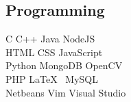 \documentclass[a4paper]{deedy-resume} %
\begin{document}
\begin{minipage}[t]{0.33\textwidth}
\subsection{Programming}

C \textbullet{} C++ \textbullet{} Java \textbullet{} NodeJS \\
HTML \textbullet{} CSS \textbullet{} JavaScript \\ 
Python \textbullet{} MongoDB \textbullet{} OpenCV \\
PHP \textbullet{} \LaTeX\ \textbullet{} MySQL \\
Netbeans \textbullet{} Vim \textbullet{} Visual Studio \\

\sectionspace %






\end{minipage} %
\hfill
%
%
\end{document}
